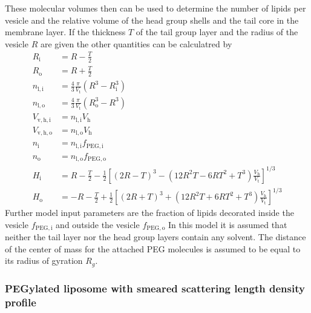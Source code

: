 These molecular volumes then can be used to determine the number of lipids per vesicle and the relative volume of the head group shells and the tail core in the membrane layer. If the thickness $T$ of the tail group layer and the radius of the vesicle $R$ are given the other quantities can be calculatred by
\begin{align}
R_\mathrm{i} &= R-\frac T2 \\
R_\mathrm{o} &= R+\frac T2 \\
n_\mathrm{l,i} &= \frac43 \frac{\pi}{V_\mathrm{t}} \left(R^3-R_\mathrm{i}^3\right) \\
n_\mathrm{l,o} &= \frac43 \frac{\pi}{V_\mathrm{t}} \left(R_\mathrm{o}^3-R^3\right) \\
V_\mathrm{v,h,i} &= n_\mathrm{l,i} V_\mathrm{h} \\
V_\mathrm{v,h,o} &= n_\mathrm{l,o} V_\mathrm{h} \\
n_\mathrm{i} &= n_\mathrm{l,i} f_\mathrm{PEG,i} \\
n_\mathrm{o} &= n_\mathrm{l,o} f_\mathrm{PEG,o} \\
H_\mathrm{i} & =  R - \frac T2 - \frac12 \left[\left(2R-T\right)^3 - \left(12R^2T-6RT^2+T^3\right)\frac{V_\mathrm{h}}{V_\mathrm{t}}\right]^{1/3} \\
H_\mathrm{o} & = -R - \frac T2 + \frac12 \left[\left(2R+T\right)^3 + \left(12R^2T+6RT^2+T^3\right)\frac{V_\mathrm{h}}{V_\mathrm{t}}\right]^{1/3}
\end{align}
Further model input parameters are the fraction of lipids decorated inside the vesicle $f_\mathrm{PEG,i}$ and outside the vesicle  $f_\mathrm{PEG,o}$
In this model it is assumed that neither the tail layer nor the head group layers contain any solvent. The distance of the center of mass for the attached PEG molecules is assumed to be equal to its radius of gyration $R_g$.
~\\
\subsubsection{PEGylated liposome with smeared scattering length density profile} ~\\

